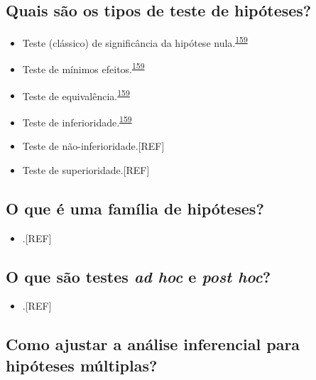 \documentclass[
  a4paper,
]{book}
\providecommand{\tightlist}{%
  \setlength{\itemsep}{0pt}\setlength{\parskip}{0pt}}
\begin{document}
\hypertarget{quais-suxe3o-os-tipos-de-teste-de-hipuxf3teses}{%
\subsection{Quais são os tipos de teste de hipóteses?}\label{quais-suxe3o-os-tipos-de-teste-de-hipuxf3teses}}

\begin{itemize}
\item
  Teste (clássico) de significância da hipótese nula.\textsuperscript{\protect\hyperlink{ref-lakens2018}{159}}
\item
  Teste de mínimos efeitos.\textsuperscript{\protect\hyperlink{ref-lakens2018}{159}}
\item
  Teste de equivalência.\textsuperscript{\protect\hyperlink{ref-lakens2018}{159}}
\item
  Teste de inferioridade.\textsuperscript{\protect\hyperlink{ref-lakens2018}{159}}
\item
  Teste de não-inferioridade.{[}REF{]}
\item
  Teste de superioridade.{[}REF{]}
\end{itemize}

\hypertarget{o-que-uxe9-uma-famuxedlia-de-hipuxf3teses}{%
\subsection{O que é uma família de hipóteses?}\label{o-que-uxe9-uma-famuxedlia-de-hipuxf3teses}}

\begin{itemize}
\tightlist
\item
  .{[}REF{]}
\end{itemize}

\hypertarget{o-que-suxe3o-testes-ad-hoc-e-post-hoc}{%
\subsection{\texorpdfstring{O que são testes \emph{ad hoc} e \emph{post hoc}?}{O que são testes ad hoc e post hoc?}}\label{o-que-suxe3o-testes-ad-hoc-e-post-hoc}}

\begin{itemize}
\tightlist
\item
  .{[}REF{]}
\end{itemize}

\hypertarget{como-ajustar-a-anuxe1lise-inferencial-para-hipuxf3teses-muxfaltiplas}{%
\subsection{Como ajustar a análise inferencial para hipóteses múltiplas?}\label{como-ajustar-a-anuxe1lise-inferencial-para-hipuxf3teses-muxfaltiplas}}
\end{document}
